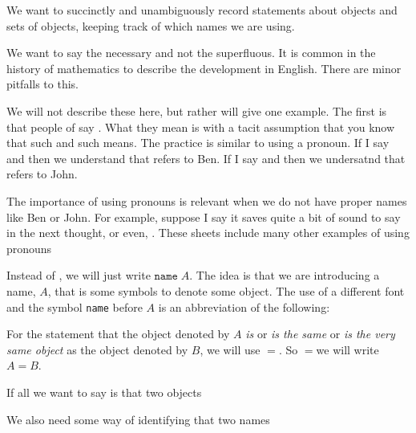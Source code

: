 

We want to succinctly and unambiguously record statements about objects and sets of objects, keeping track of which names we are using.


We want to say the necessary and not the superfluous.
It is common in the history of mathematics to describe the development in English.
There are minor pitfalls to this.

We will not describe these here, but rather will give one example.
The first is that people of say .
What they mean is  with a tacit assumption that you know that such and such means.
The practice is similar to using a pronoun.
If I say  and then  we understand that  refers to Ben.
If I say  and then  we undersatnd that  refers to John.

The importance of using pronouns is relevant when we do not have proper names like Ben or John.
For example, suppose I say  it saves quite a bit of sound to say  in the next thought, or even, .
These sheets include many other examples of using pronouns

Instead of , we will just write $\texttt{name} \; A$.
The idea is that we are introducing a name, $A$, that is some symbols to denote some object.
The use of a different font and the symbol \texttt{name} before $A$ is an abbreviation of the following: 

For the statement that the object denoted by $A$ \textit{is} or \textit{is the same} or \textit{is the very same object} as the object denoted by $B$, we will use $=$.
So $=$we will write $A = B$.

If all we want to say is that two objects

We also need some way of identifying that two names



